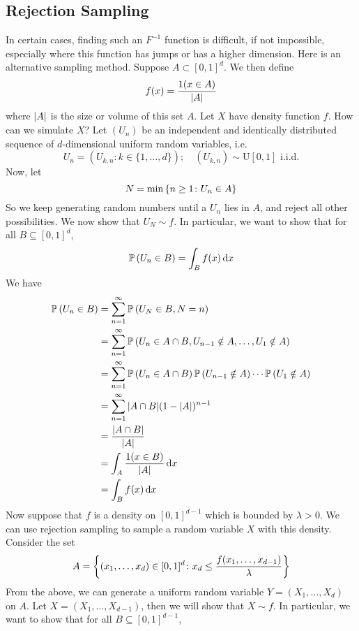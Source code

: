 \subsection{Rejection Sampling}
In certain cases, finding such an $F^{-1}$ function is difficult, if not impossible, especially where this function has jumps or has a higher dimension. Here is an alternative sampling method. Suppose $A \subset [0, 1]^d$. We then define
\[ f(x) = \frac{1(x \in A)}{\abs{A}} \]
where $\abs{A}$ is the size or volume of this set $A$. Let $X$ have density function $f$. How can we simulate $X$? Let $(U_n)$ be an independent and identically distributed sequence of $d$-dimensional uniform random variables, i.e.
\[ U_n = (U_{k, n} \colon k \in \{ 1, \dots, d \});\quad (U_{k, n}) \sim \mathrm{U}[0, 1] \text{ i.i.d.} \]
Now, let
\[ N = \min\qty{n \geq 1 \colon U_n \in A} \]
So we keep generating random numbers until a $U_n$ lies in $A$, and reject all other possibilities. We now show that $U_N \sim f$. In particular, we want to show that for all $B \subseteq [0, 1]^d$,
\[ \mathbb{P}\left({U_n \in B}\right) = \int_B f(x) \dd{x} \]
We have
\begin{align*}
	\mathbb{P}\left({U_n \in B}\right) & = \sum_{n=1}^\infty \mathbb{P}\left({U_N \in B, N = n}\right)                                                    \\
	                 & = \sum_{n=1}^\infty \mathbb{P}\left({U_n \in A \cap B, U_{n-1} \notin A, \dots, U_1 \notin A}\right)             \\
	                 & = \sum_{n=1}^\infty \mathbb{P}\left({U_n \in A \cap B}\right) \mathbb{P}\left({U_{n-1} \notin A}\right) \cdots \mathbb{P}\left({U_1 \notin A}\right) \\
	                 & = \sum_{n=1}^\infty \abs{A \cap B} (1 -\abs{A})^{n-1}                                          \\
	                 & = \frac{\abs{A \cap B}}{\abs{A}}                                                               \\
	                 & = \int_A \frac{1(x \in B)}{\abs{A}} \dd{x}                                                     \\
	                 & = \int_B f(x) \dd{x}
\end{align*}
Now suppose that $f$ is a density on $[0, 1]^{d-1}$ which is bounded by $\lambda > 0$. We can use rejection sampling to sample a random variable $X$ with this density. Consider the set
\[ A = \qty{(x_1, \dots, x_d) \in [0, 1]^d \colon x_d \leq \frac{f(x_1, \dots, x_{d-1})}{\lambda}} \]
From the above, we can generate a uniform random variable $Y = (X_1, \dots, X_d)$ on $A$. Let $X = (X_1, \dots, X_{d-1})$, then we will show that $X \sim f$. In particular, we want to show that for all $B \subseteq [0, 1]^{d-1}$,
